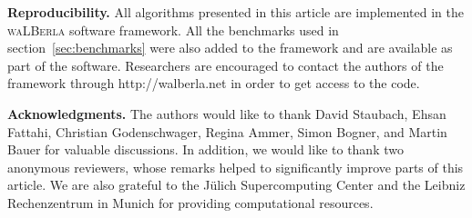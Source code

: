 \documentclass[final,leqno,onefignum,onetabnum]{siamltex1213}
\newcommand{\Walberla}{\textsc{waLBerla}}
\begin{document}
\hspace{0.5cm}

{\bf Reproducibility.}
All algorithms presented in this article are implemented in the \Walberla{} software framework.
All the benchmarks used in section~\ref{sec:benchmarks} were also added to the framework and are available as part of the software.
Researchers are encouraged to contact the authors of the framework through http://walberla.net in order to get access to the code.

\hspace{0.5cm}

{\bf Acknowledgments.}
The authors would like to thank David Staubach, Ehsan Fattahi, Christian Godenschwager, Regina Ammer, Simon Bogner, and Martin Bauer for valuable discussions.
In addition, we would like to thank two anonymous reviewers, whose remarks helped to significantly improve parts of this article.
We are also grateful to the J\"ulich Supercomputing Center and the Leibniz Rechenzentrum in Munich for providing computational resources.
\end{document}
